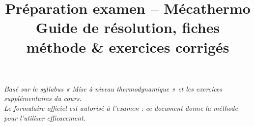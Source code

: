 \documentclass[11pt,a4paper]{article}
\title{\textbf{Préparation examen -- Mécathermo}\\[4pt]\large Guide de résolution, fiches méthode \& exercices corrigés}
\author{}
\date{}
\begin{document}
\maketitle
\vspace{-1.2cm}
\begin{center}
\small\itshape Basé sur le syllabus « Mise à niveau thermodynamique » et les exercices supplémentaires du cours.\\
Le formulaire officiel est autorisé à l'examen : ce document donne la \emph{méthode} pour l'utiliser efficacement.
\end{center}
\vspace{0.4cm}

\tableofcontents
\newpage


\newpage

\newpage

\newpage

\end{document}
